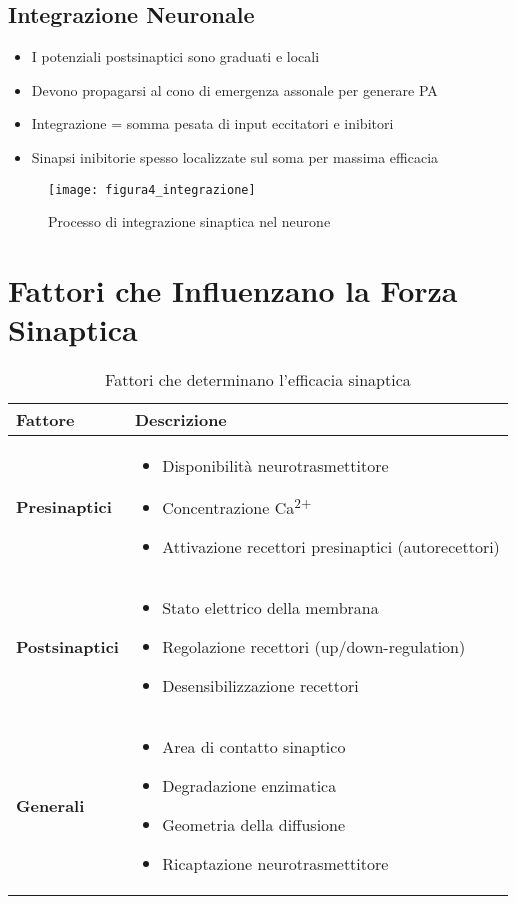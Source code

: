 \documentclass{article}
\begin{document}
\subsection{Integrazione Neuronale}
\begin{itemize}
\item I potenziali postsinaptici sono graduati e locali
\item Devono propagarsi al cono di emergenza assonale per generare PA
\item Integrazione = somma pesata di input eccitatori e inibitori
\item Sinapsi inibitorie spesso localizzate sul soma per massima efficacia
\end{itemize}

\begin{figure}[h]
\centering
\texttt{[image: figura4\_integrazione]}
\caption{Processo di integrazione sinaptica nel neurone}
\label{fig:integrazione}
\end{figure}

\section{Fattori che Influenzano la Forza Sinaptica}
\begin{table}[h]
\centering
\caption{Fattori che determinano l'efficacia sinaptica}
\begin{tabular}{p{4cm}p{10cm}}
\toprule
\textbf{Fattore} & \textbf{Descrizione} \\
\midrule
\textbf{Presinaptici} & 
\begin{itemize}
\item Disponibilità neurotrasmettitore
\item Concentrazione Ca\textsuperscript{2+}
\item Attivazione recettori presinaptici (autorecettori)
\end{itemize} \\
\midrule
\textbf{Postsinaptici} & 
\begin{itemize}
\item Stato elettrico della membrana
\item Regolazione recettori (up/down-regulation)
\item Desensibilizzazione recettori
\end{itemize} \\
\midrule
\textbf{Generali} & 
\begin{itemize}
\item Area di contatto sinaptico
\item Degradazione enzimatica
\item Geometria della diffusione
\item Ricaptazione neurotrasmettitore
\end{itemize} \\
\bottomrule
\end{tabular}
\label{tab:forza_sinaptica}
\end{table}
\end{document}
